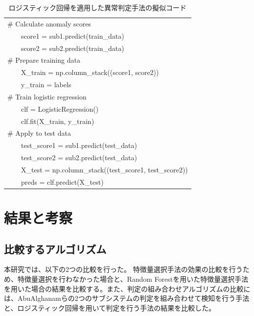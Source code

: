 \documentclass{css}
\begin{document}
\begin{table}[h!]
    \centering
    \caption{ロジスティック回帰を適用した異常判定手法の擬似コード}
    \begin{tabular}{|l|}
    \hline
    \# Calculate anomaly scores \\
       \ \ \ \ score1 = sub1.predict(train\_data) \\
       \ \ \ \ score2 = sub2.predict(train\_data) \\ 
    \# Prepare training data \\
       \ \ \ \ X\_train = np.column\_stack((score1, score2)) \\
       \ \ \ \ y\_train = labels \\ 
    \# Train logistic regression \\
       \ \ \ \ clf = LogisticRegression() \\
       \ \ \ \ clf.fit(X\_train, y\_train) \\ 
    \# Apply to test data \\
       \ \ \ \ test\_score1 = sub1.predict(test\_data) \\
       \ \ \ \ test\_score2 = sub2.predict(test\_data) \\
       \ \ \ \ X\_test = np.column\_stack((test\_score1, test\_score2)) \\
       \ \ \ \ preds = clf.predict(X\_test) \\ 
    \hline
    \end{tabular}
    \label{tab:logistic_regression}
\end{table}


\section{結果と考察}

\subsection{比較するアルゴリズム}

本研究では、以下の2つの比較を行った。
特徴量選択手法の効果の比較を行うため、特徴量選択を行わなかった場合と、Random Forestを用いた特徴量選択手法を用いた場合の結果を比較する。また、判定の組み合わせアルゴリズムの比較には、AbuAlghanamらの2つのサブシステムの判定を組み合わせて検知を行う手法\cite{AbuAlghanam2023-sx}と、ロジスティック回帰を用いて判定を行う手法の結果を比較した。
\end{document}

